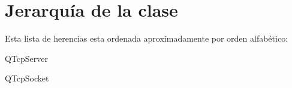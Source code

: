 \section{Jerarquía de la clase}
Esta lista de herencias esta ordenada aproximadamente por orden alfabético\+:\begin{DoxyCompactList}
\item {}
\item Q\+Tcp\+Server\begin{DoxyCompactList}
\item {}
\end{DoxyCompactList}
\item Q\+Tcp\+Socket\begin{DoxyCompactList}
\item {}
\end{DoxyCompactList}
\end{DoxyCompactList}
